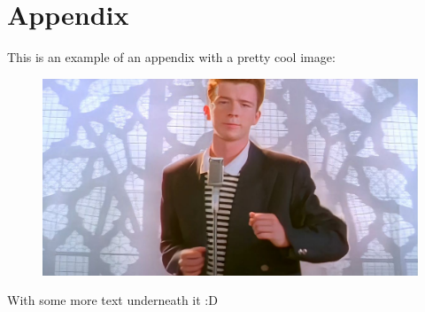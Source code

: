 \chapter{Appendix}

This is an example of an appendix with a pretty cool image:

\begin{figure}[H]
	\centering
	\includegraphics[width=\textwidth]{assets/example-asset.jpg}
\end{figure}

With some more text underneath it :D